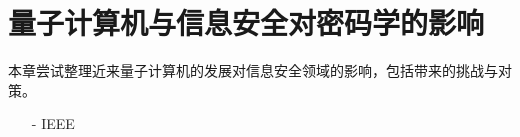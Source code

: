 \chapter{量子计算机与信息安全对密码学的影响}
\label{chap:2}

本章尝试整理近来量子计算机的发展对信息安全领域的影响，包括带来的挑战与对策。

\begin{itemize}
\item [-]IEEE 
\end{itemize}



